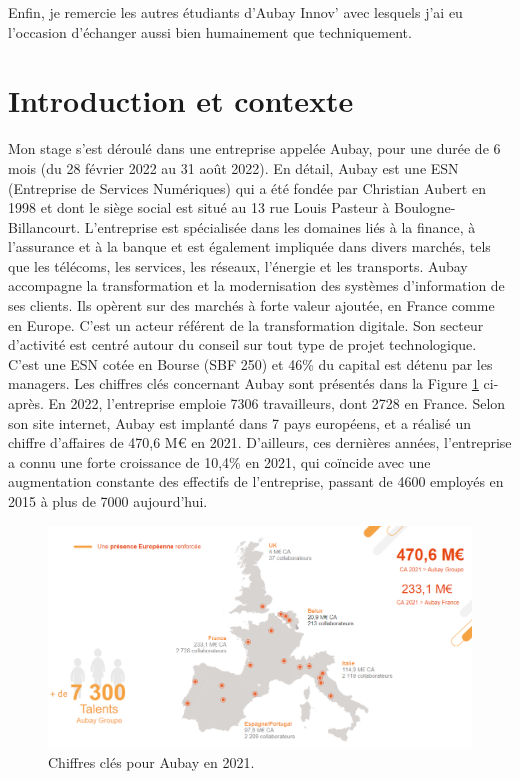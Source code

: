 \documentclass[11pt]{article}
\begin{document}
    Enfin, je remercie les autres étudiants d’Aubay Innov' avec lesquels j'ai eu l'occasion d'échanger aussi bien humainement que techniquement.

  \pagebreak
  \section{Introduction et contexte}    
  
  Mon stage s'est déroulé dans une entreprise appelée Aubay, pour une durée de 6 mois (du 28 février 2022 au 31 août 2022). 
  En détail, Aubay est une ESN (Entreprise de Services Numériques) qui a été fondée par Christian Aubert en 1998 et 
  dont le siège social est situé au 13 rue Louis Pasteur à Boulogne-Billancourt. L'entreprise est spécialisée dans les domaines 
  liés à la finance, à l'assurance et à la banque et est également impliquée dans divers marchés, tels que les télécoms, 
  les services, les réseaux, l'énergie et les transports. Aubay accompagne la transformation et la modernisation des systèmes 
  d’information de ses clients. Ils opèrent sur des marchés à forte valeur ajoutée, en France comme en Europe. C'est un acteur 
  référent de la transformation digitale. Son secteur d'activité est centré autour du conseil sur tout type de projet technologique.  
  C'est une ESN cotée en Bourse (SBF 250) et 46\% du capital est détenu par les managers. Les chiffres clés concernant Aubay 
  sont présentés dans la Figure \ref{fig:PA1} ci-après. En 2022, l'entreprise emploie 7306 travailleurs, dont 2728 en France. 
  Selon son site internet, Aubay est implanté dans 7 pays européens, et a réalisé un chiffre d'affaires de 470,6 M€ en 2021. 
  D'ailleurs, ces dernières années, l'entreprise a connu une forte croissance de 10,4\% en 2021, qui coïncide avec une augmentation 
  constante des effectifs de l'entreprise, passant de 4600 employés en 2015 à plus de 7000 aujourd'hui.
 
  \begin{figure}[hbt]  
    \includegraphics[width=\textwidth]{PresentationAubay1.png}    
    \caption{Chiffres clés pour Aubay en 2021.}
    \label{fig:PA1}
  \end{figure}  
  
\end{document}
